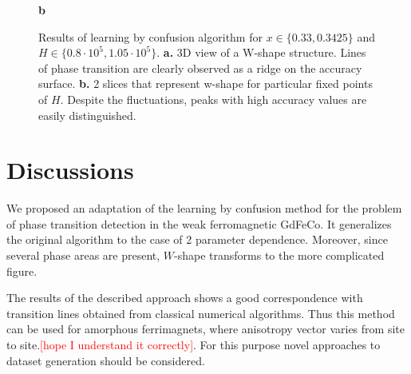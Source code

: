 \begin{figure}[h]
\begin{minipage}{0.45\textwidth}
        \caption*{\textbf{b}}
        \label{fig:narrow_slices}
    \end{minipage}
    \caption{Results of learning by confusion algorithm for $x \in \{0.33, 0.3425\}$ and $H \in \{0.8 \cdot 10^5, 1.05 \cdot 10^5\}$. \textbf{a.} 3D view of a W-shape structure. Lines of phase transition are clearly observed as a ridge on the accuracy surface. \textbf{b.} 2 slices that represent w-shape for particular fixed points of $H$. Despite the fluctuations, peaks with high accuracy values are easily distinguished.}
    \label{fig:bifurcation}
\end{figure}

\section{Discussions}\label{Discussions}
We proposed an adaptation of the learning by confusion method for the problem of phase transition detection in the weak ferromagnetic GdFeCo.
It generalizes the original algorithm to the case of 2 parameter dependence.
Moreover, since several phase areas are present, $W$-shape transforms to the more complicated figure.

The results of the described approach shows a good correspondence with transition lines obtained from classical numerical algorithms.
Thus this method can be used for amorphous ferrimagnets, where anisotropy vector varies from site to site.\textcolor{red}{[hope I understand it correctly]}.
For this purpose novel approaches to dataset generation should be considered.
